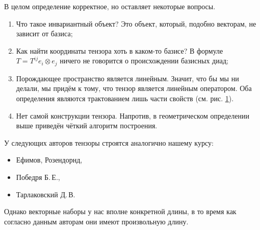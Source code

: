 В целом определение корректное, но оставляет некоторые вопросы.
\begin{enumerate}
  \item Что такое инвариантный объект? Это объект, который, подобно векторам, не
    зависит от базиса;
  \item Как найти координаты тензора хоть в каком-то базисе? В формуле
    $T = T^{ij} e_i \otimes e_j$ ничего не говорится о происхождении базисных
    диад;

  \item Порождающее пространство является линейным. Значит, что бы мы ни делали,
    мы придём к тому, что тензор является
    линейным оператором. Оба определения являются трактованием лишь части
    свойств (см. рис. \ref{fig:bred}).
    \begin{figure}[H]\label{fig:bred}
    	\centering
    	
      \caption{}
    \end{figure}

  \item Нет самой конструкции тензора. Напротив, в геометрическом определении
    выше приведён чёткий алгоритм 
    построения.
\end{enumerate}

У следующих авторов тензоры строятся аналогично нашему курсу:
\begin{itemize}[label=--]
  \item Ефимов, Розендорнд,
  \item Победря Б.\,Е.,
  \item Тарлаковский Д.\,В.
\end{itemize}
Однако векторные наборы у нас вполне конкретной длины, в то время как согласно
данным
авторам они имеют произвольную длину.

